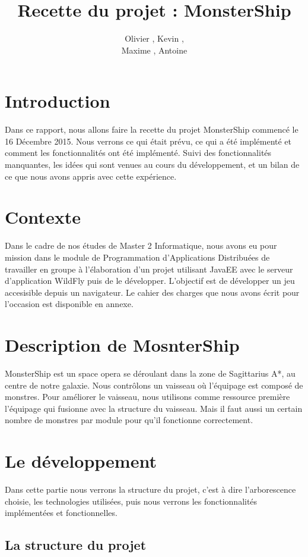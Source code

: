 \documentclass[a4paper,11pt]{report}
\title{Recette du projet : MonsterShip}
\author{Olivier \bsc{Boissard}, Kevin \bsc{Boulala},\\Maxime \bsc{Dubois}, Antoine \bsc{Lavier}}
\begin{document}
\maketitle
\setcounter{tocdepth}{1}
\tableofcontents

\chapter{Introduction}
  Dans ce rapport, nous allons faire la recette du projet MonsterShip commencé le 16 Décembre 2015. Nous verrons ce qui était prévu, ce qui a été implémenté et comment les fonctionnalités ont été implémenté. Suivi des fonctionnalités manquantes, les idées qui sont venues au cours du développement, et un bilan de ce que nous avons appris avec cette expérience.
  
\chapter{Contexte}
  Dans le cadre de nos études de Master 2 Informatique, nous avons eu pour mission dans le module de Programmation d'Applications Distribuées de travailler en groupe à l'élaboration d'un projet utilisant JavaEE avec le serveur d'application WildFly puis de le développer. L'objectif est de développer un jeu accesisible depuis un navigateur. Le cahier des charges que nous avons écrit pour l'occasion est disponible en annexe.

\chapter{Description de MosnterShip}
  MonsterShip est un space opera se déroulant dans la zone de Sagittarius A*, au centre de notre galaxie. Nous contrôlons un vaisseau où l'équipage est composé de monstres. Pour améliorer le vaisseau, nous utilisons comme ressource première l'équipage qui fusionne avec la structure du vaisseau. Mais il faut aussi un certain nombre de monstres par module pour qu'il fonctionne correctement.

\chapter{Le développement}
  Dans cette partie nous verrons la structure du projet, c'est à dire l'arborescence choisie, les technologies utilisées, puis nous verrons les fonctionnalités implémentées et fonctionnelles.

  \section{La structure du projet}
\end{document}
